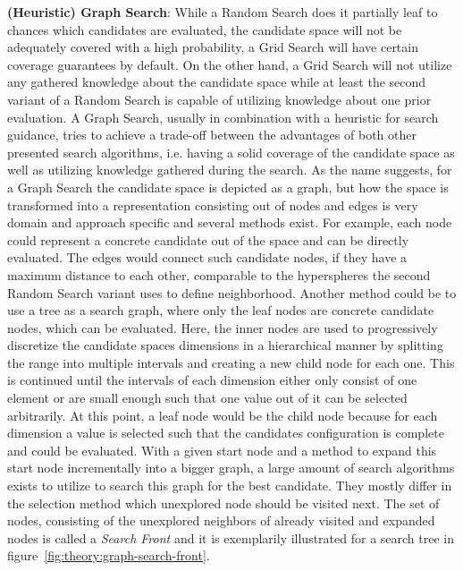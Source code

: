 \textbf{(Heuristic) Graph Search}: While a Random Search does it partially leaf to chances which candidates are evaluated, the candidate space will not be adequately covered with a high probability, a Grid Search will have certain coverage guarantees by default.
On the other hand, a Grid Search will not utilize any gathered knowledge about the candidate space while at least the second variant of a Random Search is capable of utilizing knowledge about one prior evaluation.
A Graph Search, usually in combination with a heuristic for search guidance, tries to achieve a trade-off between the advantages of both other presented search algorithms, i.e. having a solid coverage of the candidate space as well as utilizing knowledge gathered during the search.\newline
As the name suggests, for a Graph Search the candidate space is depicted as a graph, but how the space is transformed into a representation consisting out of nodes and edges is very domain and approach specific and several methods exist.
For example, each node could represent a concrete candidate out of the space and can be directly evaluated.
The edges would connect such candidate nodes, if they have a maximum distance to each other, comparable to the hyperspheres the second Random Search variant uses to define neighborhood.
Another method could be to use a tree as a search graph, where only the leaf nodes are concrete candidate nodes, which can be evaluated.
Here, the inner nodes are used to progressively discretize the candidate spaces dimensions in a hierarchical manner by splitting the range into multiple intervals and creating a new child node for each one.
This is continued until the intervals of each dimension either only consist of one element or are small enough such that one value out of it can be selected arbitrarily.
At this point, a leaf node would be the child node because for each dimension a value is selected such that the candidates configuration is complete and could be evaluated.\newline
With a given start node and a method to expand this start node incrementally into a bigger graph, a large amount of search algorithms exists to utilize to search this graph for the best candidate.
They mostly differ in the selection method which unexplored node should be visited next.
The set of nodes, consisting of the unexplored neighbors of already visited and expanded nodes is called a \textit{Search Front} and it is exemplarily illustrated for a search tree in figure~\ref{fig:theory:graph-search-front}.
